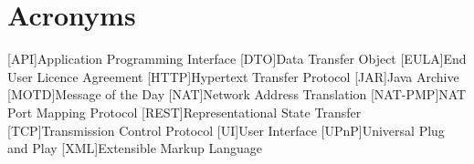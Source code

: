 \renewcommand{\chaptername}{Chapter}
\renewcommand{\appendixname}{Appendix}
\renewcommand{\figurename}{Figure}
\renewcommand{\tablename}{Table}

\chapter{Acronyms}

\begin{acronym}
  [API]{Application Programming Interface}
  [DTO]{Data Transfer Object}
  [EULA]{End User Licence Agreement}
  [HTTP]{Hypertext Transfer Protocol}
  [JAR]{Java Archive}
  [MOTD]{Message of the Day}
  [NAT]{Network Address Translation}
  [NAT-PMP]{NAT Port Mapping Protocol}
  [REST]{Representational State Transfer}
  [TCP]{Transmission Control Protocol}
  [UI]{User Interface}
  [UPnP]{Universal Plug and Play}
  [XML]{Extensible Markup Language}
\end{acronym}

